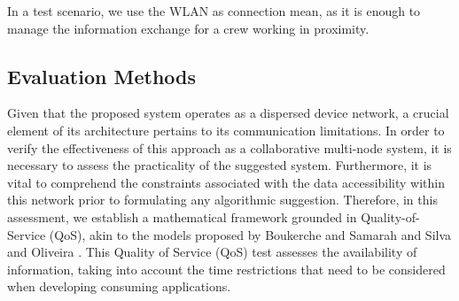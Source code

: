 \begin{table}[h!]
\centering
\caption{WPAN and WLAN connectivity technologies.}
\label{tab:networks}
\end{table}

In a test scenario, we use the WLAN as connection mean, as it is enough to manage the information exchange for a crew working in proximity.


\subsection{Evaluation Methods}

Given that the proposed system operates as a dispersed device network, a crucial element of its architecture pertains to its communication limitations. In order to verify the effectiveness of this approach as a collaborative multi-node system, it is necessary to assess the practicality of the suggested system. Furthermore, it is vital to comprehend the constraints associated with the data accessibility within this network prior to formulating any algorithmic suggestion. Therefore, in this assessment, we establish a mathematical framework grounded in Quality-of-Service (QoS), akin to the models proposed by Boukerche and Samarah \cite{boukerche2008novel} and Silva and Oliveira \cite{silva2019analyzing}. This Quality of Service (QoS) test assesses the availability of information, taking into account the time restrictions that need to be considered when developing consuming applications.


